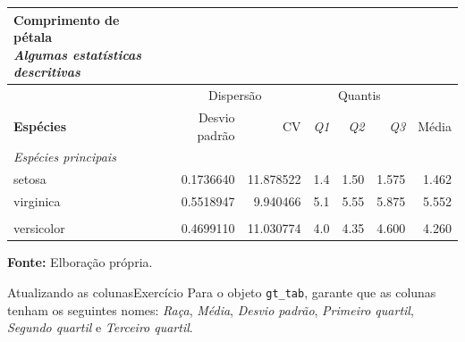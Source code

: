 \documentclass[
  10pt,
  ignorenonframetext,
]{beamer}
\begin{document}
\begin{frame}
\setlength{\LTpost}{0mm}
\begin{longtable}{lrrrrrr}
\caption*{
{\large \textbf{Comprimento de pétala}} \\ 
{\small \emph{Algumas estatísticas descritivas}}
} \\ 
\toprule
 & \multicolumn{2}{c}{Dispersão} & \multicolumn{3}{c}{Quantis} &  \\ 
\cmidrule(lr){2-3} \cmidrule(lr){4-6}
\textbf{Espécies} & Desvio padrão & CV & \emph{Q1} & \emph{Q2} & \emph{Q3} & Média \\ 
\midrule
\multicolumn{7}{l}{\emph{Espécies principais}} \\ 
\midrule
setosa & 0.1736640 & 11.878522 & 1.4 & 1.50 & 1.575 & 1.462 \\ 
virginica & 0.5518947 & 9.940466 & 5.1 & 5.55 & 5.875 & 5.552 \\ 
\midrule
\multicolumn{7}{l}{\vspace*{-5mm}} \\ 
versicolor & 0.4699110 & 11.030774 & 4.0 & 4.35 & 4.600 & 4.260 \\ 
\bottomrule
\end{longtable}
\begin{minipage}{\linewidth}
\textbf{Fonte:} Elboração própria.\\
\end{minipage}
\end{frame}

\begin{frame}[fragile]{Atualizando as colunas\newline Exercício}
\protect\hypertarget{atualizando-as-colunasexercuxedcio}{}
Para o objeto \texttt{gt\_tab}, garante que as colunas tenham os
seguintes nomes: \emph{Raça}, \emph{Média}, \emph{Desvio padrão},
\emph{Primeiro quartil}, \emph{Segundo quartil} e \emph{Terceiro
quartil}.
\end{frame}
\end{document}
